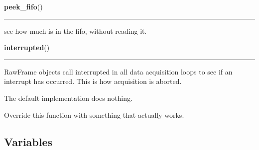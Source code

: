     \vspace{0.5ex}

    \begin{boxedminipage}{\textwidth}

    \raggedright \textbf{peek\_fifo}()

    \vspace{-1.5ex}

    \rule{\textwidth}{0.5\fboxrule}
    see how much is in the fifo, without reading it.

    \vspace{1ex}

    \end{boxedminipage}

    \label{ociw:interrupted}

    \vspace{0.5ex}

    \begin{boxedminipage}{\textwidth}

    \raggedright \textbf{interrupted}()

    \vspace{-1.5ex}

    \rule{\textwidth}{0.5\fboxrule}
    RawFrame objects call interrupted in all data acquisition loops to see 
    if an interrupt has occurred. This is how acquisition is aborted.

    The default implementation does nothing.

    Override this function with something that actually works.

    \vspace{1ex}

    \end{boxedminipage}



  \subsection{Variables}

